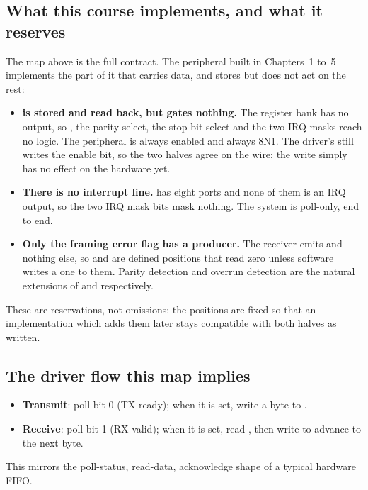 \subsection{What this course implements, and what it reserves}
\label{proto:reserved}
The map above is the full contract. The peripheral built in Chapters~1 to~5 implements the part of
it that carries data, and stores but does not act on the rest:
\begin{itemize}
  \item \textbf{ is stored and read back, but gates nothing.} The register bank has no
     output, so , the parity select, the stop-bit select and the two IRQ
    masks reach no logic. The peripheral is always enabled and always 8N1. The driver's
     still writes the enable bit, so the two halves agree on the wire; the write
    simply has no effect on the hardware yet.
  \item \textbf{There is no interrupt line.}  has eight ports and none of them is an
    IRQ output, so the two IRQ mask bits mask nothing. The system is poll-only, end to end.
  \item \textbf{Only the framing error flag has a producer.} The receiver emits 
    and nothing else, so  and  are defined positions that read zero
    unless software writes a one to them. Parity detection and overrun detection are the natural
    extensions of  and  respectively.
\end{itemize}
These are reservations, not omissions: the positions are fixed so that an implementation which adds
them later stays compatible with both halves as written.

\subsection{The driver flow this map implies}
\label{proto:flow}
\begin{itemize}
  \item \textbf{Transmit}: poll  bit 0 (TX ready); when it is set, write a byte to
    .
  \item \textbf{Receive}: poll  bit 1 (RX valid); when it is set, read ,
    then write  to advance to the next byte.
\end{itemize}
This mirrors the poll-status, read-data, acknowledge shape of a typical hardware FIFO.

